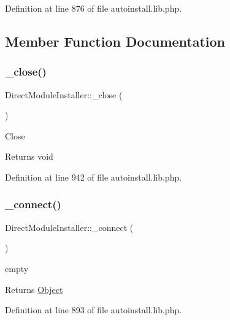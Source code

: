 Definition at line 876 of file autoinstall.\+lib.\+php.



\subsection{Member Function Documentation}
\mbox{\label{classDirectModuleInstaller_acda2b7c05a32c6f9641fc24c2e3e6962}} 
\subsubsection{\texorpdfstring{\+\_\+close()}{\_close()}}
{\footnotesize\ttfamily Direct\+Module\+Installer\+::\+\_\+close (\begin{DoxyParamCaption}{ }\end{DoxyParamCaption})}

Close

\begin{DoxyReturn}{Returns}
void 
\end{DoxyReturn}


Definition at line 942 of file autoinstall.\+lib.\+php.

\mbox{\label{classDirectModuleInstaller_a8131092380fdf3c78082de11f4c83f70}} 
\subsubsection{\texorpdfstring{\+\_\+connect()}{\_connect()}}
{\footnotesize\ttfamily Direct\+Module\+Installer\+::\+\_\+connect (\begin{DoxyParamCaption}{ }\end{DoxyParamCaption})}

empty

\begin{DoxyReturn}{Returns}
\hyperlink{classObject}{Object} 
\end{DoxyReturn}


Definition at line 893 of file autoinstall.\+lib.\+php.

\mbox{\label{classDirectModuleInstaller_acc70fcfb029792d83a577fbbebfcb918}} 
